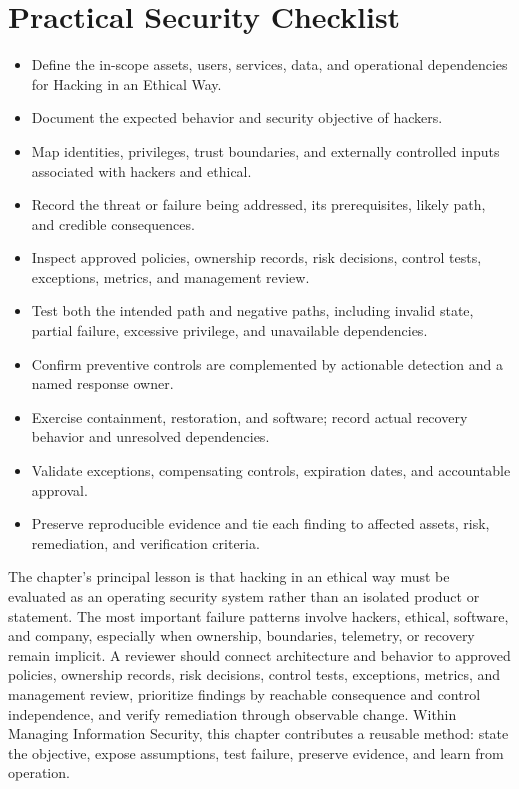 \documentclass[11pt]{article}
\begin{document}
\section*{Practical Security Checklist}
\begin{itemize}[label=$\square$]
\item Define the in-scope assets, users, services, data, and operational dependencies for Hacking in an Ethical Way.
\item Document the expected behavior and security objective of hackers.
\item Map identities, privileges, trust boundaries, and externally controlled inputs associated with hackers and ethical.
\item Record the threat or failure being addressed, its prerequisites, likely path, and credible consequences.
\item Inspect approved policies, ownership records, risk decisions, control tests, exceptions, metrics, and management review.
\item Test both the intended path and negative paths, including invalid state, partial failure, excessive privilege, and unavailable dependencies.
\item Confirm preventive controls are complemented by actionable detection and a named response owner.
\item Exercise containment, restoration, and software; record actual recovery behavior and unresolved dependencies.
\item Validate exceptions, compensating controls, expiration dates, and accountable approval.
\item Preserve reproducible evidence and tie each finding to affected assets, risk, remediation, and verification criteria.
\end{itemize}
\begin{synthesisbox}
The chapter's principal lesson is that hacking in an ethical way must be evaluated as an operating security system rather than an isolated product or statement. The most important failure patterns involve hackers, ethical, software, and company, especially when ownership, boundaries, telemetry, or recovery remain implicit. A reviewer should connect architecture and behavior to approved policies, ownership records, risk decisions, control tests, exceptions, metrics, and management review, prioritize findings by reachable consequence and control independence, and verify remediation through observable change. Within Managing Information Security, this chapter contributes a reusable method: state the objective, expose assumptions, test failure, preserve evidence, and learn from operation.
\end{synthesisbox}
\end{document}
